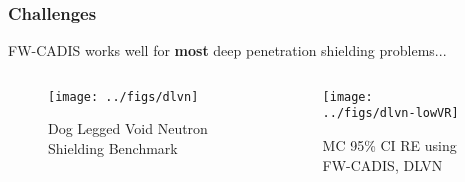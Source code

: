 \documentclass[xcolor=x11names,compress]{beamer}
\renewcommand{\(}{\begin{columns}}
\renewcommand{\)}{\end{columns}}
\newcommand{\<}[1]{\begin{column}{#1}}
\renewcommand{\>}{\end{column}}
\begin{document}
\begin{frame}[fragile]
  \frametitle{Challenges}

	FW-CADIS works well for \textbf{most} deep penetration
	shielding problems...
	\begin{columns}
  	\begin{column}{0.5\textwidth}
  	\begin{figure}
  	\begin{center}
  		\texttt{[image: ../figs/dlvn]}
		\caption{Dog Legged Void Neutron Shielding Benchmark}
	\end{center}
  	\end{figure}
  	\end{column}
 	\begin{column}{0.5\textwidth}
 	\begin{figure}
  	\begin{center}
  		\texttt{[image: ../figs/dlvn-lowVR]}
  		\caption{MC 95\% CI RE using FW-CADIS, DLVN}
  	\end{center}
  	\end{figure}
  	\end{column}
	\end{columns}
  
\end{frame}
\end{document}
